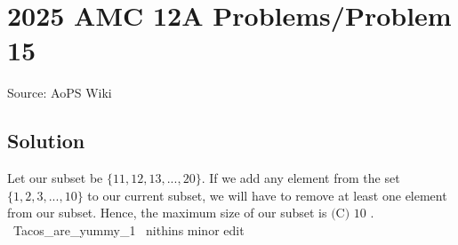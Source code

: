\documentclass[12pt]{article}
\begin{document}
\section*{{2025 AMC 12A Problems/Problem 15}}
Source: AoPS Wiki

\subsection*{Solution}
Let our subset be $\{11,12,13,...,20\}.$ If we add any element from the set $\{1,2,3,...,10\}$ to our current subset, we will have to remove at least one element from our subset. Hence, the maximum size of our subset is $\boxed{\text{(C) }10}$ . ~Tacos_are_yummy_1 ~nithins minor edit
\end{document}
